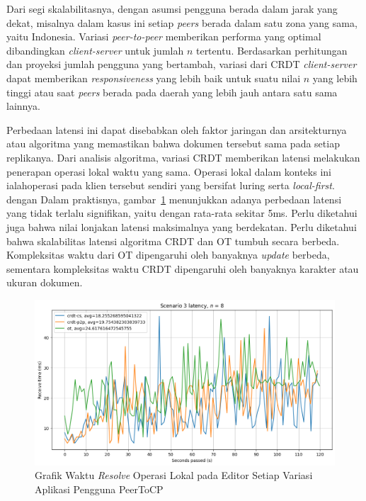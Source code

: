 Dari segi skalabilitasnya, dengan asumsi pengguna berada dalam jarak yang dekat, misalnya dalam kasus ini setiap \textit{peers} berada dalam satu zona yang sama, yaitu Indonesia. Variasi \textit{peer-to-peer} memberikan performa yang optimal dibandingkan \textit{client-server} untuk jumlah $n$ tertentu. Berdasarkan perhitungan dan proyeksi jumlah pengguna yang bertambah, variasi dari CRDT \textit{client-server} dapat memberikan \textit{responsiveness} yang lebih baik untuk suatu nilai $n$ yang lebih tinggi atau saat \textit{peers} berada pada daerah yang lebih jauh antara satu sama lainnya.

Perbedaan latensi ini dapat disebabkan oleh faktor jaringan dan arsitekturnya atau algoritma yang memastikan bahwa dokumen tersebut sama pada setiap replikanya. Dari analisis algoritma, variasi CRDT memberikan latensi melakukan penerapan operasi lokal waktu yang sama. Operasi lokal dalam konteks ini ialahoperasi pada klien tersebut sendiri yang bersifat luring serta \textit{local-first}. dengan  Dalam praktisnya, gambar~\ref{fig:12-5} menunjukkan adanya perbedaan latensi yang tidak terlalu signifikan, yaitu dengan rata-rata sekitar 5ms. Perlu diketahui juga bahwa nilai lonjakan latensi maksimalnya yang berdekatan. Perlu diketahui bahwa skalabilitas latensi algoritma CRDT dan OT tumbuh secara berbeda. Kompleksitas waktu dari OT dipengaruhi oleh banyaknya \textit{update} berbeda, sementara kompleksitas waktu CRDT dipengaruhi oleh banyaknya karakter atau ukuran dokumen.

\begin{figure}
 \centering
 \includegraphics[width=15cm]{./assets/skripsi/benchmark-vis_cell_12_output_5}
 \caption{Grafik Waktu \textit{Resolve} Operasi Lokal pada Editor Setiap Variasi Aplikasi Pengguna PeerToCP}
 \label{fig:12-5}
\end{figure}

